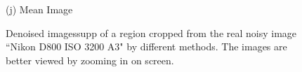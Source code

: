 \documentclass[10pt,onecolumn,letterpaper]{article}
\begin{document}
\begin{figure}[H]
{\begin{minipage}[t]{0.196\textwidth}
{\footnotesize (j) Mean Image \cite{crosschannel2016} }
\end{minipage}
}
\caption{Denoised imagessupp of a region cropped from the real noisy image ``Nikon D800 ISO 3200 A3" \cite{crosschannel2016} by different methods. The images are better viewed by zooming in on screen.} 
\label{fig18}
\end{figure}

\begin{figure}[H]\vspace{1mm}
\centering
{}
\end{figure}
\end{document}
